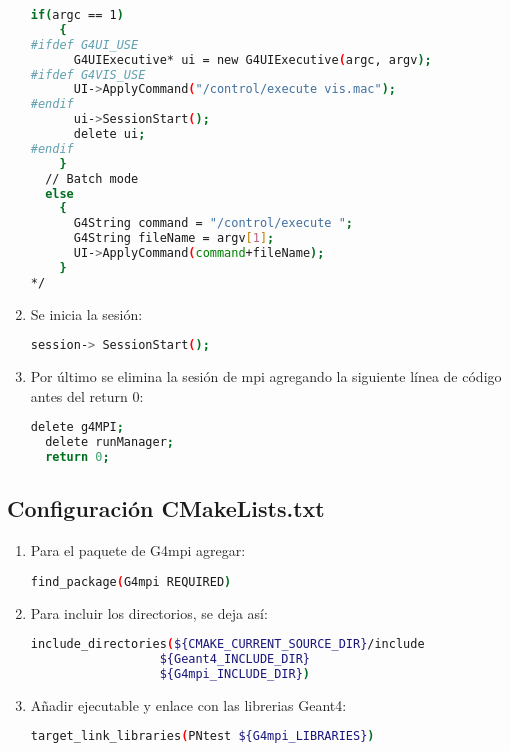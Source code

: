 \begin{enumerate}
\begin{lstlisting}[language=bash,style=mystyle]
  if(argc == 1)
    {
#ifdef G4UI_USE
      G4UIExecutive* ui = new G4UIExecutive(argc, argv);
#ifdef G4VIS_USE
      UI->ApplyCommand("/control/execute vis.mac");
#endif
      ui->SessionStart();
      delete ui;
#endif
    }
  // Batch mode
  else
    {
      G4String command = "/control/execute ";
      G4String fileName = argv[1];
      UI->ApplyCommand(command+fileName);
    }
*/
\end{lstlisting}
    
    \item Se inicia la sesión:
\begin{lstlisting}[language=bash,style=mystyle]
session-> SessionStart();
\end{lstlisting}

    \item Por último se elimina la sesión de mpi agregando la siguiente línea de código antes del return 0:   
\begin{lstlisting}[language=bash,style=mystyle]
  delete g4MPI;
  delete runManager;
  return 0;
\end{lstlisting}    
\end{enumerate}



\subsection{Configuración CMakeLists.txt}


\begin{enumerate}

    \item Para el paquete de G4mpi agregar:
\begin{lstlisting}[language=bash,style=mystyle]
find_package(G4mpi REQUIRED) 
\end{lstlisting}

    \item Para incluir los directorios, se deja así:
\begin{lstlisting}[language=bash,style=mystyle]
include_directories(${CMAKE_CURRENT_SOURCE_DIR}/include
			      ${Geant4_INCLUDE_DIR}
			      ${G4mpi_INCLUDE_DIR})
\end{lstlisting}

    \item Añadir ejecutable y enlace con las librerias Geant4:
\begin{lstlisting}[language=bash,style=mystyle]
target_link_libraries(PNtest ${G4mpi_LIBRARIES})
\end{lstlisting}

\end{enumerate}



